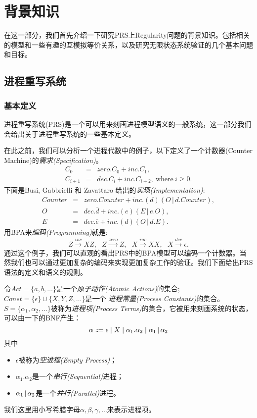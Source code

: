\chapter{背景知识}
\label{chap:pre}

在这一部分，我们首先介绍一下研究PRS上Regularity问题的背景知识。包括相关的模型和一些有趣的互模拟等价关系，以及研究无限状态系统验证的几个基本问题和目标。

\section{进程重写系统}
\label{sec:prs}

\subsection{基本定义}
\label{subsec:basic-def}

进程重写系统(PRS)是一个可以用来刻画进程模型语义的一般系统，这一部分我们会给出关于进程重写系统的一些基本定义。\cite{Mayr2000}

在此之前，我们可以分析一个进程代数中的例子\cite{Milner1989}，以下定义了一个计数器(Counter Machine)的\emph{需求(Specification)}。
\begin{eqnarray*}
C_{0} &=& zero.C_{0}+inc.C_{1}, \\
C_{i+1} &=& dec.C_{i}+inc.C_{i+2},\ \mathrm{where}\ i\ge0.
\end{eqnarray*}
下面是Busi, Gabbrielli 和 Zavattaro 给出的\emph{实现(Implementation)}\cite{Busi2003}:
\begin{eqnarray*}
Counter &=& zero.Counter+inc.(d)(O\,|\,d.Counter), \\
O &=& dec.\overline{d}+inc.(e)(E\,|\,e.O), \\
E &=& dec.\overline{e}+inc.(d)(O\,|\,d.E).
\end{eqnarray*}
用BPA来\emph{编码(Programming)}就是:
\[
Z \stackrel{inc}{\longrightarrow} XZ, \ \ \
Z \stackrel{zero}{\longrightarrow} Z, \ \ \
X \stackrel{inc}{\longrightarrow} XX, \ \ \
X \stackrel{dec}{\longrightarrow} \epsilon.
\]
通过这个例子，我们可以直观的看出PRS中的BPA模型可以编码一个计数器。当然我们也可以通过更加复杂的编码来实现更加复杂工作的验证。我们下面给出PRS语法的定义和语义的规则。

\begin{defn}\label{def:process-term}
令$Act=\{a,b,\ldots\}$是一个\emph{原子动作(Atomic Actions)}的集合;$Const=\{\epsilon\}\cup\{X,Y,Z,\ldots\}$是一个 \emph{进程常量(Process Constants)}的集合。
$S=\{\alpha_1,\alpha_2,\ldots\}$被称为\emph{进程项(Process Terms)}的集合，它被用来刻画系统的状态，可以由一下的BNF产生：
$$\alpha\Coloneqq \epsilon\mid X\mid \alpha_1.\alpha_2\mid \alpha_1\,|\, \alpha_2$$
其中
\begin{itemize}
\item $\epsilon$被称为\emph{空进程(Empty Process)}；
\item $\alpha_1.\alpha_2$是一个\emph{串行(Sequential)}进程；
\item $\alpha_1\,|\, \alpha_2$是一个\emph{并行(Parallel)}进程。
\end{itemize}
我们这里用小写希腊字母$\alpha,\beta,\gamma,\ldots$来表示进程项。
\end{defn}

